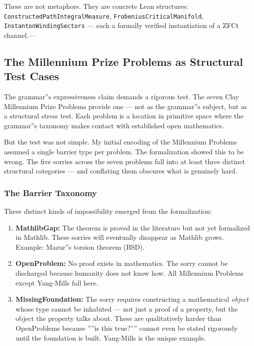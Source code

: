 \documentclass[12pt,a4paper]{article}
\begin{document}
These are not metaphors. They are concrete Lean structures: \texttt{ConstructedPathIntegralMeasure}, \texttt{FrobeniusCriticalManifold}, \texttt{InstantonWindingSectors} --- each a formally verified instantiation of a ZFCt channel.---

\subsection{The Millennium Prize Problems as Structural Test Cases}

The grammar''s expressiveness claim demands a rigorous test. The seven Clay Millennium Prize Problems provide one --- not as the grammar''s subject, but as a structural stress test. Each problem is a location in primitive space where the grammar''s taxonomy makes contact with established open mathematics.

But the test was not simple. My initial encoding of the Millennium Problems assumed a single barrier type per problem. The formalization showed this to be wrong. The five sorries across the seven problems fall into at least three distinct structural categories --- and conflating them obscures what is genuinely hard.

\subsubsection{The Barrier Taxonomy}

Three distinct kinds of impossibility emerged from the formalization:

\begin{enumerate}
    \item \textbf{MathlibGap:} The theorem is proved in the literature but not yet formalized in Mathlib. These sorries will eventually disappear as Mathlib grows. Example: Mazur''s torsion theorem (BSD).
    \item \textbf{OpenProblem:} No proof exists in mathematics. The sorry cannot be discharged because humanity does not know how. All Millennium Problems except Yang-Mills fall here.
    \item \textbf{MissingFoundation:} The sorry requires constructing a mathematical \emph{object} whose type cannot be inhabited --- not just a proof of a property, but the object the property talks about. These are qualitatively harder than OpenProblems because ''''is this true?'''' cannot even be stated rigorously until the foundation is built. Yang-Mills is the unique example.
\end{enumerate}
\end{document}
